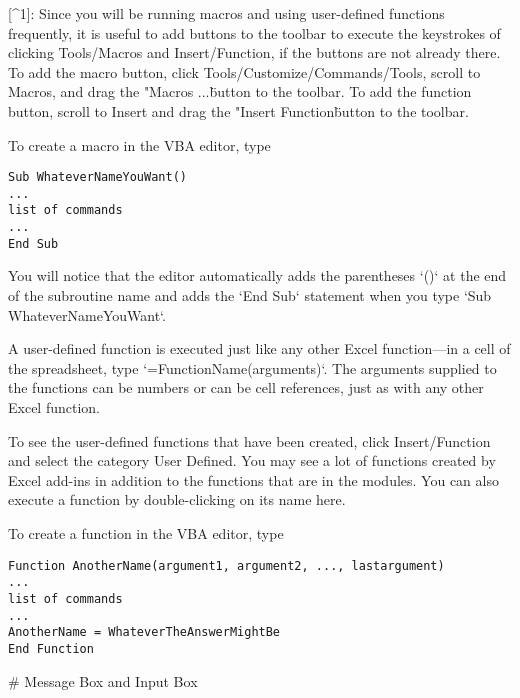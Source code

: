 [^1]: Since you will be running macros and using user-defined functions
    frequently, it is useful to add buttons to the toolbar to execute
    the keystrokes of clicking Tools/Macros and Insert/Function, if the
    buttons are not already there. To add the macro button, click
    Tools/Customize/Commands/Tools, scroll to Macros, and drag the
    "Macros ...\" button to the toolbar. To add the function button,
    scroll to Insert and drag the "Insert Function\" button to the
    toolbar.


\vfil\eject
To create a macro in the VBA editor, type 
\small\begin{verbatim}
Sub WhateverNameYouWant()
...
list of commands
...
End Sub
\end{verbatim}\normalsize
You will notice that the editor automatically adds the parentheses `()`
at the end of the subroutine name and adds the `End Sub` statement when
you type `Sub WhateverNameYouWant`.


A user-defined function is executed just like any other Excel
function---in a cell of the spreadsheet, type
`=FunctionName(arguments)`. The arguments supplied to the functions can
be numbers or can be cell references, just as with any other Excel
function.

To see the user-defined functions that have been created, click Insert/Function and select the category User Defined.  You may see a lot of functions created by Excel add-ins in addition to the functions that are in the modules.  You can also execute a function by double-clicking on its name here.

To create a function in the VBA editor, type
\small\begin{verbatim}
Function AnotherName(argument1, argument2, ..., lastargument)
...
list of commands
...
AnotherName = WhateverTheAnswerMightBe
End Function
\end{verbatim}\normalsize



# Message Box and Input Box

